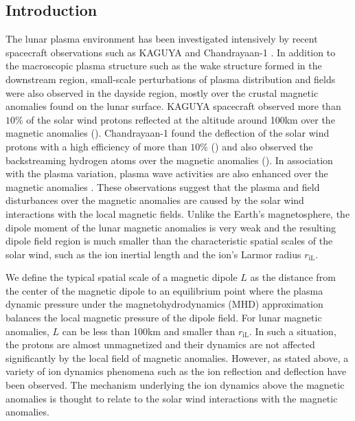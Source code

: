 \documentclass[draft,jgrga]{agutex2015}
\begin{document}
%

\begin{article}

%
%

\section{Introduction}
The lunar plasma environment has been  investigated 
intensively by recent spacecraft observations  such as
KAGUYA \citep[e.g.][]{Saito2008,Saito2010,Saito2012} and
Chandrayaan-1 \citep[e.g.][]{Barabash2009,Bhardwaj2010}.
In addition to the macroscopic plasma structure
such as the wake structure formed in the downstream region,
small-scale perturbations of plasma distribution and fields were also
 observed in the dayside region,
mostly over the crustal magnetic anomalies found on the lunar surface.
KAGUYA spacecraft observed
more than $10 \%$ of the solar wind protons reflected at the altitude around 100km
over the magnetic anomalies (\cite{Saito2010}).
Chandrayaan-1 found the deflection of the solar wind protons with
a high efficiency of more than $ 10 \%$ (\cite{Lue2011}) and
also observed the backstreaming hydrogen atoms over the magnetic anomalies (\cite{Wieser2010}).
In association with the plasma variation,
plasma wave activities are also enhanced over the magnetic anomalies
\citep[e.g.][]{Halekas2006a,Hashimoto2010}.
These observations suggest that the plasma and field disturbances over
the magnetic anomalies are caused by the solar wind interactions
with the local magnetic fields.
Unlike the Earth's magnetosphere, %
the dipole moment of
the lunar magnetic anomalies is very weak and
the resulting dipole field region is much smaller than the characteristic spatial scales
of the solar wind, such as the ion inertial length and the ion's Larmor radius $r_\mathrm{iL}$.



We define the typical spatial scale of a magnetic dipole $L$ 
as the distance from the center of the magnetic dipole 
to an equilibrium point 
where the plasma dynamic pressure under the magnetohydrodynamics (MHD) approximation 
balances  the local magnetic pressure of the dipole field.
For lunar magnetic anomalies,
$L$ can be less than 100km and smaller than $r_\mathrm{iL}$.
In such a situation,
the protons are almost unmagnetized and their dynamics are not affected significantly 
by the local field of magnetic anomalies.
However, as stated above,
a variety of ion dynamics phenomena such as the ion reflection and deflection have been observed.
The mechanism underlying the ion dynamics above the magnetic anomalies is thought to relate
to the solar wind interactions with the magnetic anomalies.


\end{article}
\end{document}
